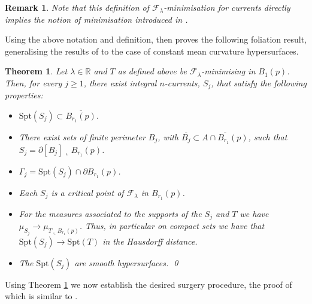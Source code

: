 \documentclass[11pt]{article}
\newtheorem{thm}{Theorem}
\newtheorem{rem}{Remark}
\begin{document}
\begin{rem}
    Note that this definition of $\mathcal{F}_\lambda$-minimisation for currents directly implies the notion of minimisation introduced in \cite{Kostas23}.
\end{rem}

Using the above notation and definition, \cite{Kostas23} then proves the following foliation result, generalising the results of \cite{hardt-simon} to the case of constant mean curvature hypersurfaces.

\begin{thm}\label{thm: Kostas foliation}\cite{Kostas23}
Let $\lambda \in \mathbb{R}$ and $T$ as defined above be $\mathcal{F}_\lambda$-minimising in $B_1(p)$. Then, for every $j \geq 1$, there exist integral $n$-currents, $S_j$, that satisfy the following properties:
\begin{itemize}
    \item $\mathrm{Spt}(S_j) \subset \overline{B_{r_1}(p)}$.

    \item There exist sets of finite perimeter $B_j$, with $\overline{B_j} \subset \overline{A \cap B_{r_1}(p)}$, such that $S_j = \partial [B_j] \llcorner B_{r_1}(p)$.

    \item $\Gamma_j = \mathrm{Spt}(S_j) \cap \partial B_{r_1}(p)$.

    \item Each $S_j$ is a critical point of $\mathcal{F}_\lambda$ in $B_{r_1}(p)$.

    \item For the measures associated to the supports of the $S_j$ and $T$ we have $\mu_{S_j} \rightarrow \mu_{T \llcorner B_{r_1}(p)}$. Thus, in particular on compact sets we have that $\mathrm{Spt}(S_j) \rightarrow \mathrm{Spt}(T)$ in the Hausdorff distance.

    \item The $\mathrm{Spt}(S_j)$ are smooth hypersurfaces. \qed
\end{itemize}
\end{thm}

Using Theorem \ref{thm: Kostas foliation} we now establish the desired surgery procedure, the proof of which is similar to \cite[Proposition 4.1]{C-L-S}.
\end{document}
